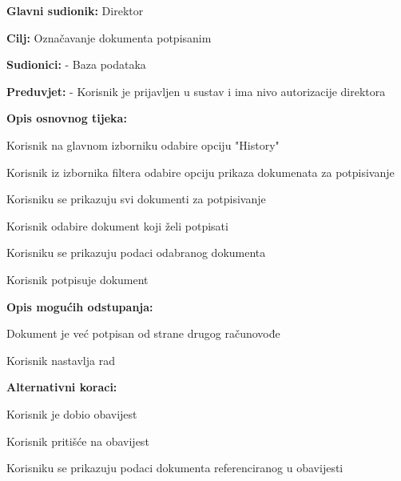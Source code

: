 					\noindent {}
						\begin{packed_item}
		
							\item \textbf{Glavni sudionik:} Direktor
							\item  \textbf{Cilj:} Označavanje dokumenta potpisanim
							\item  \textbf{Sudionici:} - Baza podataka
							\item  \textbf{Preduvjet:} - Korisnik je prijavljen u sustav i ima nivo autorizacije direktora
							\item  \textbf{Opis osnovnog tijeka:}
							
							\item[] \begin{packed_enum}
								\item Korisnik na glavnom izborniku odabire opciju "History"
								\item Korisnik iz izbornika filtera odabire opciju prikaza dokumenata za potpisivanje
								\item Korisniku se prikazuju svi dokumenti za potpisivanje
								\item Korisnik odabire dokument koji želi potpisati
								\item Korisniku se prikazuju podaci odabranog dokumenta
								\item Korisnik potpisuje dokument
							\end{packed_enum}
							
							\item  \textbf{Opis mogućih odstupanja:}
							
							\item[] \begin{packed_item}
		
								\item[4.a]Dokument je već potpisan od strane drugog računovođe
								\item[] \begin{packed_enum}
									\item Korisnik nastavlja rad
								\end{packed_enum}
							\end{packed_item}

							\item  \textbf{Alternativni koraci:}

							\item[] \begin{packed_item}
		
								\item[1-4.a]Korisnik je dobio obavijest
								\item[] \begin{packed_enum}
									\item Korisnik pritišće na obavijest
									\item Korisniku se prikazuju podaci dokumenta referenciranog u obavijesti
								\end{packed_enum}
							\end{packed_item}
						\end{packed_item}

